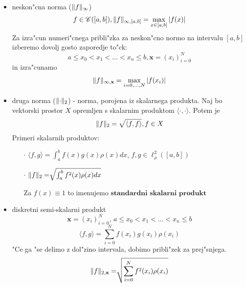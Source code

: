 \documentclass[a4paper,12pt]{article}
\DeclarePairedDelimiter\norm{\lVert}{\rVert}
\newcommand{\innerproduct}[2]{\langle #1, #2 \rangle}
\theoremstyle{definition}
\theoremstyle{remark}
\begin{document}
\begin{itemize}
    \item neskon"cna norma ($\norm{f}_{\infty}$)
    \begin{equation*}
        f \in \mathscr{C}([a, b]), \norm{f}_{\infty, [a, b]} = \max_{x \in [a, b]} \left| f(x) \right|
    \end{equation*}
    Za izra"cun numeri"cnega pribli"zka za neskon"cno normo na intervalu $[a, b]$ izberemo dovolj gosto zaporedje to"ck:
    \begin{equation*}
        a \leq x_0 < x_1 < \dots < x_n \leq b, \textbf{x} = (x_i)_{i=0}^N
    \end{equation*}
    in izra"cunamo
    \begin{equation*}
        \norm{f}_{\infty, \textbf{x}} = \max_{i = 0, \dots, N} \left| f(x_i) \right|
    \end{equation*}

    \item druga norma ($\norm{\cdot}_2$) - norma, porojena iz skalarnega produkta.
    Naj bo vektorski prostor $X$ opremljen s skalarnim produktom $\innerproduct{\cdot}{\cdot}$. Potem je 
    \begin{equation*}
        \norm{f}_2 = \sqrt{\innerproduct{f}{f}}, f \in X
    \end{equation*}
    Primeri skalarnih produktov:
    \begin{enumerate}
        \item[$\cdot$] $\innerproduct{f}{g} = \int_{a}^{b} f(x) g(x) \rho(x) dx$, $f, g \in \ell_{\rho}^2 ([a, b])$
        \item[$\cdot$] $\norm{f}_2 = \sqrt[]{\int_{a}^{b} f^2(x)\rho(x)dx }$
        
        Za $f(x) \equiv 1$ to imenujemo $\textbf{standardni skalarni produkt}$
    \end{enumerate}

    \item diskretni semi-skalarni produkt
    \begin{equation*}
        \textbf{x} = (x_i)_{i=0}^N \text{, }a \leq x_0 < x_1 < \dots < x_n \leq b
    \end{equation*}
    \begin{equation*}
        \innerproduct{f}{g} = \sum_{i = 0}^{N} f(x_i) g(x_i) \rho(x_i)
    \end{equation*}
    "Ce ga "se delimo z dol"zino intervala, dobimo pribli"zek za prej"snjega.
    \begin{equation*}
        \norm{f}_{2, \textbf{x}} = \sqrt[]{\sum_{i = 0}^{N} f^2(x_i)\rho(x_i)}
    \end{equation*}
\end{itemize}
\end{document}
